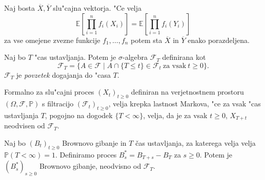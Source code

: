 \documentclass[twoside,11pt]{article}
\begin{document}
\begin{lema}
    Naj bosta $\overline{X}, \overline{Y} $ slu"cajna vektorja. "Ce velja 
    $$
        \mathbb{E}\left[\prod_{i=1}^n f_i(X_i)\right] = \mathbb{E}\left[\prod_{i=1}^n f_i(Y_i)\right]
    $$
    za vse omejene zvezne funkcije $f_1, \ldots, f_n$ potem sta $\overline{X}$ in $\overline{Y}$ enako porazdeljena.
\end{lema}

\begin{definicija}
    Naj bo $T$ "cas ustavljanja. Potem  je $\sigma$-algebra $\mathcal{F}_T$ definirana kot
    $$
        \mathcal{F}_T = \{A \in \mathcal{F} \mid A \cap \{T \leq t\} \in \mathcal{F}_t \ \text{za vsak} \ t\geq 0\}.
    $$
    $\mathcal{F}_T$ je \textit{povzetek} dogajanja do "casa $T$.
\end{definicija}

Formalno za slu"cajni proces $(X_t)_{t\geq0}$ definiran na verjetnostnem prostoru $(\Omega, \mathcal{F}, \mathbb{P})$ s filtracijo $(\mathcal{F}_t)_{t\geq0}$, velja
krepka lastnost Markova, "ce za vsak "cas ustavljanja $T$, pogojno na dogodek $\{T < \infty\}$, velja, da je za vsak $t \geq 0$,  $X_{T + t}$ neodvisen od $\mathcal{F}_T$.

\begin{izrek}
    Naj bo $(B_t)_{t\geq 0}$ Brownovo gibanje in $T$ čas ustavljanja, za katerega velja velja $\mathbb{P}(T<\infty )=1$.
    Definiramo proces $B^*_s = B_{T + s} - B_T$ za $s\geq0$. Potem je $(B^*_s)_{s\geq0}$ Brownovo
    gibanje, neodvisno od $\mathcal{F}_T$.
\end{izrek}
\end{document}
